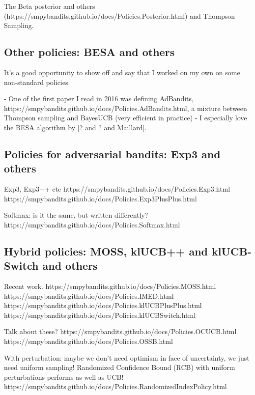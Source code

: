 The Beta posterior and others (https://smpybandits.github.io/docs/Policies.Posterior.html) and Thompson Sampling.


\subsection{Other policies: BESA and others}

It's a good opportunity to show off and say that I worked on my own on some non-standard policies.

- One of the first paper I read in 2016 was defining AdBandits, https://smpybandits.github.io/docs/Policies.AdBandits.html, a mixture between Thompson sampling and BayesUCB (very efficient in practice)
- I especially love the BESA algorithm by [? and ? and Maillard].


\subsection{Policies for adversarial bandits: Exp3 and others}

Exp3, Exp3++ etc
https://smpybandits.github.io/docs/Policies.Exp3.html
https://smpybandits.github.io/docs/Policies.Exp3PlusPlus.html

Softmax: is it the same, but written differently?
https://smpybandits.github.io/docs/Policies.Softmax.html


\subsection{Hybrid policies: MOSS, klUCB++ and klUCB-Switch and others}

Recent work.
https://smpybandits.github.io/docs/Policies.MOSS.html
https://smpybandits.github.io/docs/Policies.IMED.html
https://smpybandits.github.io/docs/Policies.klUCBPlusPlus.html
https://smpybandits.github.io/docs/Policies.klUCBSwitch.html

Talk about these?
https://smpybandits.github.io/docs/Policies.OCUCB.html
https://smpybandits.github.io/docs/Policies.OSSB.html

With perturbation: maybe we don't need optimism in face of uncertainty, we just need uniform sampling!
Randomized Confidence Bound (RCB) with uniform perturbations performs as well as UCB!
https://smpybandits.github.io/docs/Policies.RandomizedIndexPolicy.html


